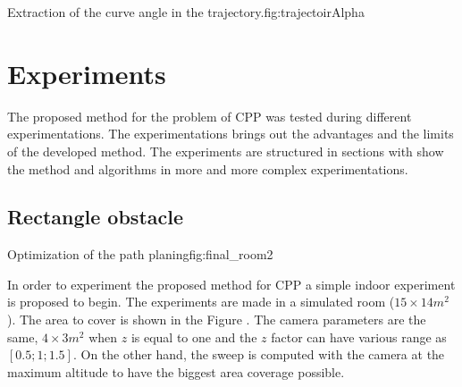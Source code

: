  \begin{mfigures}[!]{Extraction of the curve angle in the trajectory.}{fig:trajectoirAlpha} \centering
{}
\end{mfigures} 
	
	
				



			\section{Experiments} \label{sec:experiment}
			
The proposed method for the problem of CPP was tested during different experimentations. The experimentations brings out the advantages and the limits of the developed method. The experiments are structured in sections with show the method and algorithms in more and more complex experimentations.

\subsection{Rectangle obstacle} \label{experiment}

 \begin{mfigures}[!]{Optimization of the path planing}{fig:final_room2} \centering
\hspace{1cm}

\tabsVrepPath
\end{mfigures} 

In order to experiment the proposed method for CPP a simple indoor experiment is proposed to begin.
The experiments are made in a simulated room ($15 \times 14 m^2$). The area to cover is shown in the Figure . The camera parameters are the same, $4 \times 3 m^2$ when $z$ is equal to one and the $z$ factor can have various range as $[0.5;1;1.5]$. On the other hand, the sweep is computed with the camera at the maximum altitude to have the biggest area coverage possible.

